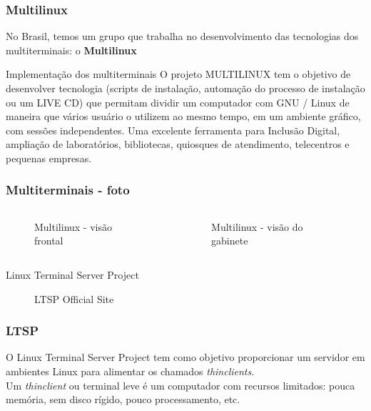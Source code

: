 \documentclass[utf8,9pt]{beamer}
\begin{document}
	  \begin{frame}
		  \frametitle{Multilinux}
		  No Brasil, temos um grupo que trabalha no desenvolvimento das tecnologias dos multiterminais: o \textbf{Multilinux}
		  \begin{block}{Implementação dos multiterminais}
		  O projeto MULTILINUX tem o objetivo de desenvolver tecnologia (scripts de instalação, automação do processo de instalação ou um LIVE CD) que permitam dividir um computador com GNU / Linux de maneira que vários usuário o utilizem ao mesmo tempo, em um ambiente gráfico, com sessões independentes. Uma excelente ferramenta para Inclusão Digital, ampliação de laboratórios, bibliotecas, quiosques de atendimento, telecentros e pequenas empresas.
		  \end{block}
	  \end{frame}

	  \begin{frame}
		  \frametitle{Multiterminais - foto}
		  
		  \begin{columns}
			  \column{.5\textwidth}
				  \begin{figure}
					  \pgfuseimage{pc-frente}
					  \caption{Multilinux - visão frontal}
				  \end{figure}

			  \column{.5\textwidth}
				  \begin{figure}
					  \pgfuseimage{pc-tras}
					  \caption{Multilinux - visão do gabinete}
				  \end{figure}
		  \end{columns}
	  \end{frame}

	  \begin{frame}
		  \begin{center}
			  \Huge{Linux Terminal Server Project}
			  \begin{figure}
				  \pgfuseimage{ltsp}
				  \caption{LTSP Official Site}
			  \end{figure}
		  \end{center}
	  \end{frame}


	  \begin{frame}
		  \frametitle{LTSP}
		  O Linux Terminal Server Project tem como objetivo proporcionar um servidor em ambientes Linux para alimentar os chamados \textit{thinclients}.\\
		  Um \textit{thinclient} ou terminal leve é um computador com recursos limitados: pouca memória, sem disco rígido, pouco processamento, etc.

	  \end{frame}
\end{document}
